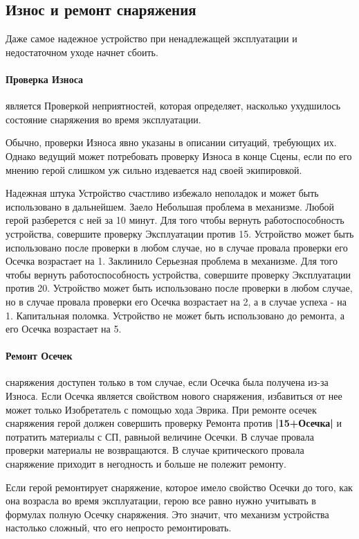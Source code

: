 \subsection{Износ и ремонт снаряжения}
Даже самое надежное устройство при ненадлежащей эксплуатации и недостаточном уходе начнет сбоить.
\paragraph{Проверка Износа} является Проверкой неприятностей, которая определяет, насколько ухудшилось состояние снаряжения во время эксплуатации.
\begin{tcolorbox}
Обычно, проверки Износа явно указаны в описании ситуаций, требующих их. Однако ведущий может потребовать проверку Износа в конце Сцены, если по его мнению герой слишком уж сильно издевается над своей экипировкой.
\end{tcolorbox}
\trouble
{Надежная штука}%
{Устройство счастливо избежало неполадок и может быть использовано в дальнейшем.}%
{Заело}%
{Небольшая проблема в механизме. Любой герой разберется с ней за 10 минут. Для того чтобы вернуть работоспособность устройства, совершите проверку Эксплуатации против 15. Устройство может быть использовано после проверки в любом случае, но в случае провала проверки его Осечка возрастает на 1.}%
{Заклинило}%
{Серьезная проблема в механизме. Для того чтобы вернуть работоспособность устройства, совершите проверку Эксплуатации против 20. Устройство может быть использовано после проверки в любом случае, но в случае провала проверки его Осечка возрастает на 2, а в случае успеха - на 1.}%
{Капитальная поломка.}%
{Устройство не может быть использовано до ремонта, а его Осечка возрастает на 5.}%
\paragraph{Ремонт Осечек} снаряжения доступен только в том случае, если Осечка была получена из-за Износа. Если Осечка является свойством нового снаряжения, избавиться от нее может только Изобретатель с помощью хода Эврика.
\newline
При ремонте осечек снаряжения герой должен совершить проверку Ремонта против \textbf{|15+Осечка|} и потратить материалы с СП, равныой величине Осечки. В случае провала проверки материалы не возвращаются. В случае критического провала снаряжение приходит в негодность и больше не полежит ремонту.
\begin{tcolorbox}
Если герой ремонтирует снаряжение, которое имело свойство Осечки до того, как она возрасла во время эксплуатации, герою все равно нужно учитывать в формулах полную Осечку снаряжения. Это значит, что механизм устройства настолько сложный, что его непросто ремонтировать.
\end{tcolorbox}
